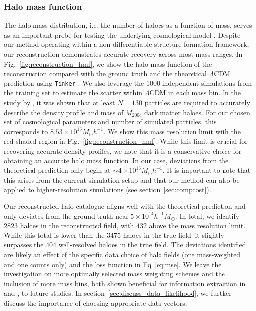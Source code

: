 \subsubsection{Halo mass function}
\label{sec:halo_reconstruction}
The halo mass distribution, i.e. the number of haloes as a function of mass, serves as an important probe for testing the underlying cosmological model \citep[see, e.g.,][]{Jenkins2001a,Artis2021a,Stopyra2021}. Despite our method operating within a non-differentiable structure formation framework, our reconstruction demonstrates accurate recovery across most mass ranges. In Fig.~\ref{fig:reconstruction_hmf}, we show the halo mass function of the reconstruction compared with the ground truth and the theoretical $\Lambda$CDM prediction using \texttt{Tinker} \citep{Tinker}. We also leverage the $1000$ independent simulations from the training set to estimate the scatter within $\Lambda$CDM in each mass bin. In the study by \citet{Mansfield2020}, it was shown that at least $N=130$ particles are required to accurately describe the density profile and mass of $M_{200\mathrm{c}}$ dark matter haloes. For our chosen set of cosmological parameters and number of simulated particles, this corresponds to $8.53\times 10^{13} M_{\odot}h^{-1}$. We show this mass resolution limit with the red shaded region in Fig.~\ref{fig:reconstruction_hmf}. While this limit is crucial for recovering accurate density profiles, we note that it is a conservative choice for obtaining an accurate halo mass function. In our case, deviations from the theoretical prediction only begin at $\sim 4 \times 10^{13} M_{\odot}h^{-1}$. It is important to note that this arises from the current simulation setup and that our method can also be applied to higher-resolution simulations (see section~\ref{sec:compcost}).

Our reconstructed halo catalogue aligns well with the theoretical prediction and only deviates from the ground truth near $5\times 10^{14}h^{-1}M_{\odot}$. In total, we identify $2823$ haloes in the reconstructed field, with $432$ above the mass resolution limit. While this total is lower than the $3475$ haloes in the true field, it slightly surpasses the $404$ well-resolved haloes in the true field. The deviations identified are likely an effect of the specific data choice of halo fields (one mass-weighted and one counts only) and the loss function in Eq~\eqref{eq:mse}. We leave the investigation on more optimally selected mass weighting schemes and the inclusion of more mass bins, both shown beneficial for information extraction in \citet{Hamaus2010} and \citet{Liu2021}, to future studies. In section~\ref{sec:discuss_data_likelihood}, we further discuss the importance of choosing appropriate data vectors.

